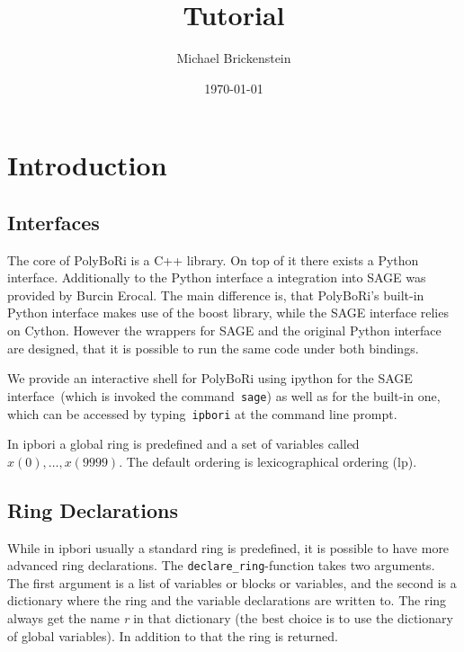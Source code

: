 \documentclass[]{article}
\title{\PolyBoRi Tutorial}
\author{Michael Brickenstein}
\date{\today}
\newcommand{\PolyBoRi}{{\sc PolyBoRi}\xspace}
\newcommand{\functionname}[1]{\textit{#1}\xspace}
\begin{document}
\ifpdf
{}
\else
{}
\fi

\maketitle
\newcommand{\Singular}{{\sc Singular}}



\section{Introduction}
\subsection{Interfaces}
The core of \PolyBoRi is a C++ library. On top of it there exists a Python interface.
Additionally to the Python interface a integration into SAGE was provided by Burcin Erocal.
The main difference is, that \PolyBoRi's built-in Python interface makes use of
the boost library, while the SAGE interface relies on Cython. 
However the wrappers for SAGE and the original Python interface are designed, that it is possible to run the same code under both bindings.

We provide an interactive shell for \PolyBoRi using ipython for the SAGE
interface~(which is invoked the command~\texttt{sage}) as well as for the
built-in one, which can be accessed by typing~\texttt{ipbori}
at the command line prompt.


In ipbori a global ring is predefined and a set of variables called  $x(0), \ldots, x(9999)$. The default ordering is lexicographical ordering (lp).

\subsection{Ring Declarations}
While in ipbori usually a standard ring is predefined,
it is possible to have more advanced ring declarations.
The \lstinline|declare_ring|-function takes two arguments.
The first argument is a list of variables or blocks or variables, and the second is a dictionary where the ring and the variable declarations are written to. The ring always get the name \functionname{r} in that dictionary (the best choice is to use the dictionary of global variables). In addition to that the ring is returned.
\end{document}
